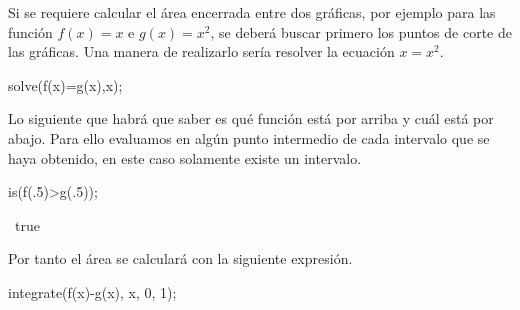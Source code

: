 Si se requiere calcular el área encerrada entre dos gráficas,
por ejemplo para las función $f(x)=x$ e $g(x)=x^2$,
se deberá buscar primero los puntos de corte de las gráficas.
Una manera de realizarlo sería resolver la ecuación
$x=x^2$.
\begin{maximai}
 solve(f(x)=g(x),x);
\end{maximai}\begin{maximao}
 \left[ x=0\operatorname{,}x=1\right]
\end{maximao}
Lo siguiente que habrá que saber es qué función está por arriba
y cuál está por abajo.
Para ello evaluamos en algún punto intermedio de cada intervalo
que se haya obtenido, en este caso solamente existe un intervalo.
\begin{maximai}
 is(f(.5)>g(.5));
\end{maximai}\begin{maximao}
 \mbox{%
  true}
\end{maximao}
Por tanto el área se calculará con la siguiente expresión.
\begin{maximai}
 integrate(f(x)-g(x), x, 0, 1);
\end{maximai}\begin{maximao}
\end{maximao}
